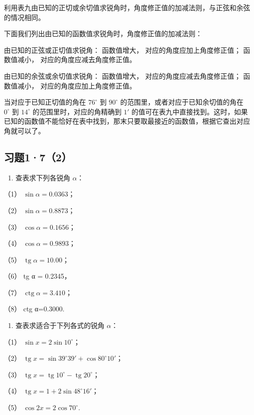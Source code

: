 利用表九由已知的正切或余切值求锐角时，角度修正值的加减法则，与正弦和余弦的情况相同。

下面我们列出由已知的函数值求锐角时，角度修正值的加减法则：

由已知的正弦或正切值求锐角： 函数值增大， 对应的角度应加上角度修正值；
函数值减小， 对应的角度应减去角度修正值。

由已知的余弦或余切值求锐角： 函数值增大， 对应的角度应减去角度修正值；
函数值减小， 对应的角度应加上角度修正值。

当对应于已知正切值的角在 \(76^{\circ}\) 到 \(90^{\circ}\)
的范围里，或者对应于已知余切值的角在 \(0^{\circ}\) 到 \(14^{\circ}\)
的范围里时，对应的角精确到 \(1'\)
的值可在表九中直接找到。这时，如果已知的函数值不能恰好在表中找到，那末只要取最接近的函数值，根据它查出对应角就可以了。

\subsection{习题1·7（2）}

\begin{enumerate}
\item
  查表求下列各锐角 \(\alpha\)：
\end{enumerate}

（1） \(\sin \alpha = 0.0363\)；

（2） \(\sin \alpha = 0.8873\)；

（3） \(\cos \alpha = 0.1656\)；

（4） \(\cos \alpha = 0.9893\)；

（5） \(\operatorname{tg} \alpha = 10.00\)；

（6） tg α = 0.2345，

（7） \(\operatorname{ctg} \alpha = 3.410\)；

（8） ctg α=0.3000.

\begin{enumerate}[start=2]
\item
  查表求适合于下列各式的锐角 \(\alpha\)：
\end{enumerate}

（1） \(\sin x = 2\sin 10^{\circ}\)；

（2）
\(\operatorname{tg} x = \sin 39^{\circ}39' + \cos 80^{\circ}10'\)；

（3）
\(\operatorname{tg} x = \operatorname{tg} 10^{\circ} - \operatorname{tg} 20^{\circ}\)；

（4） \(\operatorname{tg} x = 1 + 2\sin 48^{\circ}16'\)；

（5） \(\cos 2x = 2\cos 70^{\circ}\).

